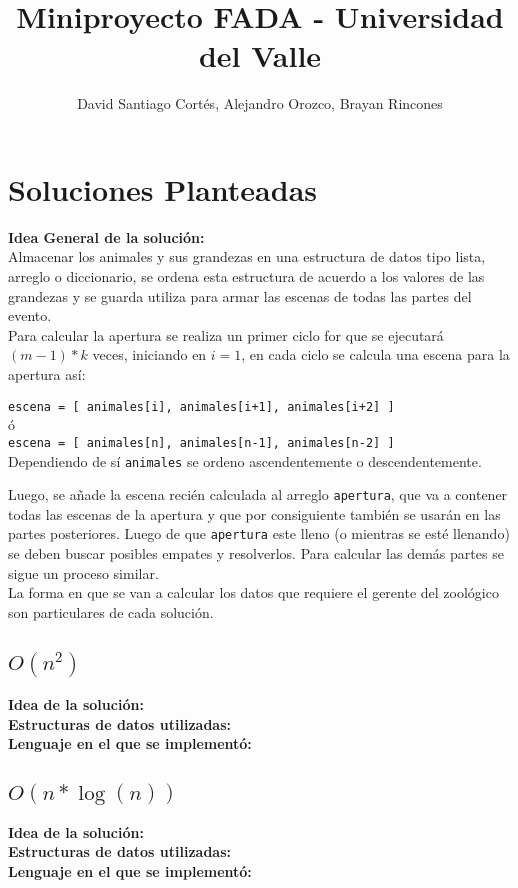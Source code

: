 \documentclass{article}
\title{Miniproyecto FADA - Universidad del Valle}
\date{}
\author{David Santiago Cortés, Alejandro Orozco, Brayan Rincones}
\begin{document}
	\maketitle

	\section{Soluciones Planteadas}
		\textbf{Idea General de la solución:}\\
		Almacenar los animales y sus grandezas en una estructura de datos tipo lista, arreglo o diccionario, 
		se ordena esta estructura de acuerdo a los valores de las grandezas y se guarda utiliza para armar las
		escenas de todas las partes del evento.\\	
		Para calcular la apertura se realiza un primer ciclo for que se ejecutará $(m-1)*k$ veces, iniciando en $i=1$, en cada ciclo se calcula
		una escena para la apertura así:
		\begin{center}
			\texttt{escena = [ animales[i], animales[i+1], animales[i+2] ]} \\
			ó\\	
			\texttt{escena = [ animales[n], animales[n-1], animales[n-2] ]}\\
			Dependiendo de sí \texttt{animales} se ordeno ascendentemente o descendentemente.
		\end{center}
		Luego, se añade la escena recién calculada al arreglo \texttt{apertura}, que va a contener todas las escenas de la apertura
		y que por consiguiente también se usarán en las partes posteriores. Luego de que \texttt{apertura} este lleno (o mientras se esté llenando)
		se deben buscar posibles empates y resolverlos. Para calcular las demás partes se sigue un proceso similar.\\
		La forma en que se van a calcular los datos que requiere el gerente del zoológico son particulares de cada solución.

		
		\subsection{$O(n^2)$}
			\textbf{Idea de la solución:}\\
			\textbf{Estructuras de datos utilizadas:} \\
			\textbf{Lenguaje en el que se implementó:}
		
		\subsection{$O(n*\log(n))$}
			\textbf{Idea de la solución:}\\
			\textbf{Estructuras de datos utilizadas:} \\
			\textbf{Lenguaje en el que se implementó:}
\end{document}
